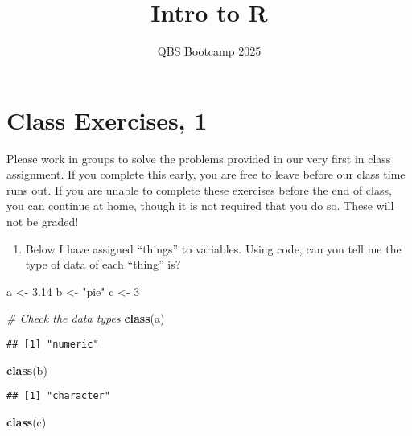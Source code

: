 \documentclass[
]{article}
\title{Intro to R}
\author{QBS Bootcamp 2025}
\date{}
\newenvironment{Shaded}{\begin{snugshade}}{\end{snugshade}}
\newcommand{\CommentTok}[1]{\textcolor[rgb]{0.56,0.35,0.01}{\textit{#1}}}
\newcommand{\DecValTok}[1]{\textcolor[rgb]{0.00,0.00,0.81}{#1}}
\newcommand{\FloatTok}[1]{\textcolor[rgb]{0.00,0.00,0.81}{#1}}
\newcommand{\FunctionTok}[1]{\textcolor[rgb]{0.13,0.29,0.53}{\textbf{#1}}}
\newcommand{\NormalTok}[1]{#1}
\newcommand{\OtherTok}[1]{\textcolor[rgb]{0.56,0.35,0.01}{#1}}
\newcommand{\StringTok}[1]{\textcolor[rgb]{0.31,0.60,0.02}{#1}}
\providecommand{\tightlist}{%
  \setlength{\itemsep}{0pt}\setlength{\parskip}{0pt}}
\begin{document}
\maketitle

\section{Class Exercises, 1}\label{class-exercises-1}

Please work in groups to solve the problems provided in our very first
in class assignment. If you complete this early, you are free to leave
before our class time runs out. If you are unable to complete these
exercises before the end of class, you can continue at home, though it
is not required that you do so. These will not be graded!

\begin{enumerate}
\def\labelenumi{\arabic{enumi})}
\tightlist
\item
  Below I have assigned ``things'' to variables. Using code, can you
  tell me the type of data of each ``thing'' is?
\end{enumerate}

\begin{Shaded}
\begin{Highlighting}[]
\NormalTok{a }\OtherTok{\textless{}{-}} \FloatTok{3.14}
\NormalTok{b }\OtherTok{\textless{}{-}} \StringTok{"pie"}
\NormalTok{c }\OtherTok{\textless{}{-}} \DecValTok{3}

\CommentTok{\# Check the data types}
\FunctionTok{class}\NormalTok{(a)}
\end{Highlighting}
\end{Shaded}

\begin{verbatim}
## [1] "numeric"
\end{verbatim}

\begin{Shaded}
\begin{Highlighting}[]
\FunctionTok{class}\NormalTok{(b)}
\end{Highlighting}
\end{Shaded}

\begin{verbatim}
## [1] "character"
\end{verbatim}

\begin{Shaded}
\begin{Highlighting}[]
\FunctionTok{class}\NormalTok{(c)}
\end{Highlighting}
\end{Shaded}
\end{document}

